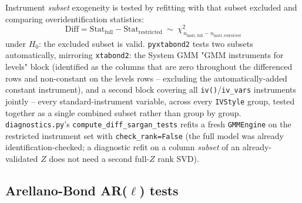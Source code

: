 \documentclass[11pt,a4paper]{article}
\newcommand{\pkg}{\texttt{pyxtabond2}}
\begin{document}
Instrument \emph{subset} exogeneity is tested by refitting with that subset
excluded and comparing overidentification statistics:
\[
  \mathrm{Diff} = \mathrm{Stat}_{\mathrm{full}} - \mathrm{Stat}_{\mathrm{restricted}}
    \ \sim\ \chi^2_{\,n_{\mathrm{instr,full}}-n_{\mathrm{instr,restricted}}}
\]
under $H_0$: the excluded subset is valid. \pkg{} tests two subsets
automatically, mirroring \texttt{xtabond2}: the System GMM "GMM instruments
for levels" block (identified as the columns that are zero throughout the
differenced rows and non-constant on the levels rows -- excluding the
automatically-added constant instrument), and a second block covering all
\texttt{iv()}/\texttt{iv\_vars} instruments jointly -- every
standard-instrument variable, across every \texttt{IVStyle} group, tested
together as a single combined subset rather than group by group.
\texttt{diagnostics.py}'s \texttt{compute\_diff\_sargan\_tests} refits a
fresh \texttt{GMMEngine} on the restricted instrument set with
\texttt{check\_rank=False}
(the full model was already identification-checked; a diagnostic refit on a
column \emph{subset} of an already-validated $Z$ does not need a second
full-$Z$ rank SVD).

\subsection{\texorpdfstring{Arellano-Bond AR($\ell$) tests}{Arellano-Bond AR(l) tests}}
\label{sec:artests}
\end{document}
